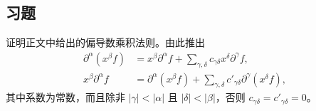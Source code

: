 \documentclass[../../main.tex]{subfiles}
\begin{document}
\subsection*{习题}
\begin{exercise}\label{exercise:ch08-leibniz}
证明正文中给出的偏导数乘积法则。由此推出
\begin{align*}
\partial^\alpha(x^\beta f)&=x^\beta\partial^\alpha f+
\sum_{\gamma,\delta}c_{\gamma\delta}x^\delta\partial^\gamma f,\\
x^\beta\partial^\alpha f&=\partial^\alpha(x^\beta f)+
\sum_{\gamma,\delta}c'_{\gamma\delta}\partial^\gamma(x^\delta f),
\end{align*}
其中系数为常数，而且除非 $|\gamma|<|\alpha|$ 且 $|\delta|<|\beta|$，否则 $c_{\gamma\delta}=c'_{\gamma\delta}=0$。
\end{exercise}
\end{document}
